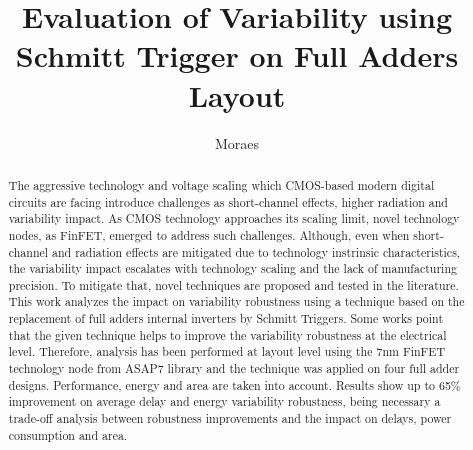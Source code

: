 \documentclass[ecp,tc, english]{iiufrgs}
\title{Evaluation of Variability using Schmitt Trigger on Full Adders Layout}
\author{Moraes}{Leonardo Barlette de}
\begin{document}
\maketitle

\clearpage

\begin{abstract}
    The aggressive technology and voltage scaling which CMOS-based modern digital circuits are facing introduce challenges as short-channel effects, higher radiation and variability impact. As CMOS technology approaches its scaling limit, novel technology nodes, as FinFET, emerged to address such challenges. Although, even when short-channel and radiation effects are mitigated due to technology instrinsic characteristics, the variability impact escalates with technology scaling and the lack of manufacturing precision. To mitigate that, novel techniques are proposed and tested in the literature. This work analyzes the impact on variability robustness using a technique based on the replacement of full adders internal inverters by Schmitt Triggers. Some works point that the given technique helps to improve the variability robustness at the electrical level. Therefore, analysis has been performed at layout level using the 7nm FinFET technology node from ASAP7 library and the technique was applied on four full adder designs. Performance, energy and area are taken into account. Results show up to 65\% improvement on average delay and energy variability robustness, being necessary a trade-off analysis between robustness improvements and the impact on delays, power consumption and area. 
\end{abstract}
\end{document}
